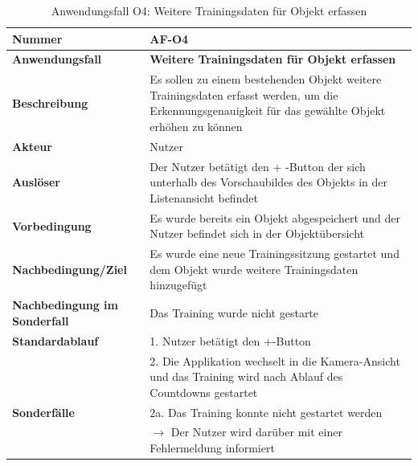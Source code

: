 \documentclass[oneside]{ausarbeitung}
\begin{document}
\begin{table}[htbp]
	\centering
	\begin{tabular}{|l|p{80mm}|}
		\hline
		\textbf{Nummer} & \textbf{AF-O4} \\ \hline
		\textbf{Anwendungsfall} & \textbf{Weitere Trainingsdaten für Objekt erfassen} \\ \hline
		\textbf{Beschreibung} & Es sollen zu einem bestehenden Objekt weitere Trainingsdaten erfasst werden, um die Erkennungsgenauigkeit für das gewählte Objekt erhöhen zu können\\ \hline
		\textbf{Akteur} & Nutzer \\ \hline
		\textbf{Auslöser} & Der Nutzer betätigt den \glqq + \grqq-Button der sich unterhalb des Vorschaubildes des Objekts in der Listenansicht befindet  \\ \hline
		\textbf{Vorbedingung} & Es wurde bereits ein Objekt abgespeichert und der Nutzer befindet sich in der Objektübersicht\\ \hline	
		\textbf{Nachbedingung/Ziel} & Es wurde eine neue Trainingssitzung gestartet und dem Objekt wurde weitere Trainingsdaten hinzugefügt \\ \hline
		\textbf{Nachbedingung im Sonderfall} & Das Training wurde nicht gestarte\\ \hline
		\textbf{Standardablauf} & 1. Nutzer betätigt den \glqq +\grqq-Button \\
		& 2. Die Applikation wechselt in die Kamera-Ansicht und das Training wird nach Ablauf des Countdowns gestartet \\ \hline
		\textbf{Sonderfälle} & 2a. Das Training konnte nicht gestartet werden \\ & $\rightarrow$ Der Nutzer wird darüber mit einer Fehlermeldung informiert \\ \hline
		
	\end{tabular}
	\caption{Anwendungsfall O4: Weitere Trainingsdaten für Objekt erfassen}
	\label{tab:use-case-add-further-samples}	
\end{table}
\end{document}
